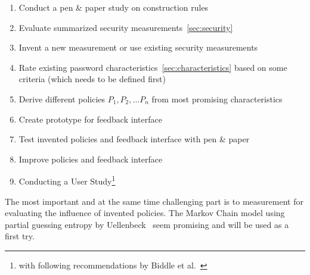 \documentclass[twocolumn, a4paper, 10pt]{article}
\begin{document}
\begin{enumerate}
	\item Conduct a pen \& paper study on construction rules
	\item Evaluate summarized security measurements~\ref{sec:security}
	\item Invent a new measurement or use existing security measurements
	\item Rate existing password characteristics~\ref{sec:characteristics} based on some criteria (which needs to be defined first)
	\item Derive different policies $P_1, P_2, \dots P_n$ from most promising characteristics
	\item Create prototype for feedback interface
	\item Test invented policies and feedback interface with pen \& paper
	\item Improve policies and feedback interface
	\item Conducting a User Study\footnote{with following recommendations by Biddle et al.~\cite{Biddle:2012:GPL:2333112.2333114}}
\end{enumerate}

The most important and at the same time challenging part is to measurement for evaluating the influence of invented policies. The Markov Chain model using partial guessing entropy by Uellenbeck~\cite{Uellenbeck:2013:QSG:2508859.2516700} seem promising and will be used as a first try.

{
	
	
}

\appendix
\end{document}
